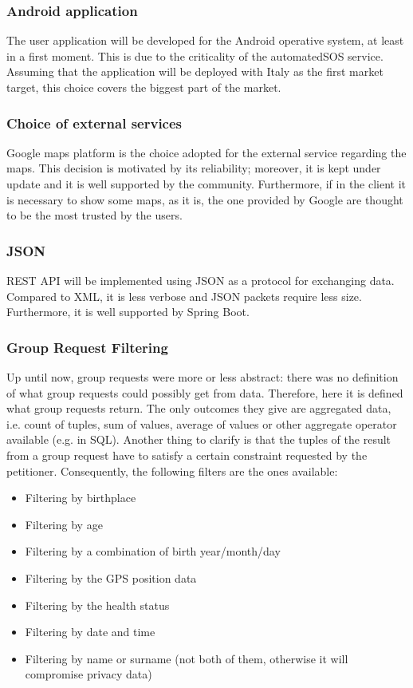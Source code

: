 \subsubsection{Android application} 	 
The user application will be developed for the Android operative system, at least in a first moment. This is due to the criticality of the
automatedSOS service. Assuming that the application will be deployed with Italy as the first market target, this choice covers the biggest
part of the market.

\subsubsection{Choice of external services}
Google maps platform is the choice adopted for the external service regarding the maps. This decision is motivated by its reliability;
moreover, it is kept under update and it is well supported by the community. Furthermore, if in the client it is necessary to show some maps,
as it is, the one provided by Google are thought to be the most trusted by the users. 


\subsubsection{JSON}
REST API will be implemented using JSON as a protocol for exchanging data. \\
Compared to XML, it is less verbose and JSON packets require less size. Furthermore, it is well supported
by Spring Boot. 

\subsubsection{Group Request Filtering}
Up until now, group requests were more or less abstract: there was no definition of what group requests could possibly get from 
data. Therefore, here it is defined what group requests return. The only outcomes they give are  aggregated data, i.e. count 
of tuples, sum of values, average of values or other aggregate operator available (e.g. in SQL). Another thing to clarify is that 
the tuples of the result from a group request have to satisfy a certain constraint requested by the petitioner. Consequently, 
the following filters are the ones available:
\begin{itemize}
\item Filtering by birthplace
\item Filtering by age
\item Filtering by a combination of birth year/month/day
\item Filtering by the GPS position data
\item Filtering by the health status
\item Filtering by date and time
\item Filtering by name or surname (not both of them, otherwise it will compromise privacy data)
\end{itemize}